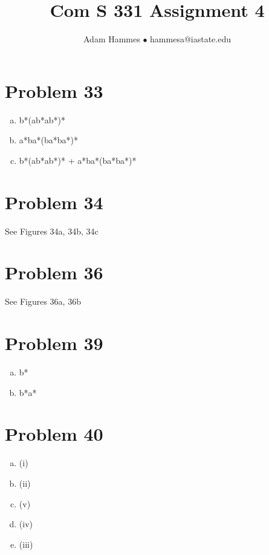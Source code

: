\documentclass[11pt]{article}
\begin{document}
\title{Com S 331 Assignment 4}
\author{Adam Hammes $\bullet$ hammesa@iastate.edu }
\maketitle

\section*{Problem 33}

\begin{enumerate}[(a)]
	\item b*(ab*ab*)*
	\item a*ba*(ba*ba*)*
	\item b*(ab*ab*)* + a*ba*(ba*ba*)*

\end{enumerate}

\section*{Problem 34}

See Figures 34a, 34b, 34c

\section*{Problem 36}

See Figures 36a, 36b

\section*{Problem 39}

\begin{enumerate}[(a)]
	\item b*
	\item b*a*
	
\end{enumerate}

\section*{Problem 40}

\begin{enumerate}[(a)]
	\item (i)
	\item (ii)
	\item (v)
	\item (iv)
	\item (iii)
	
\end{enumerate}
\end{document}
